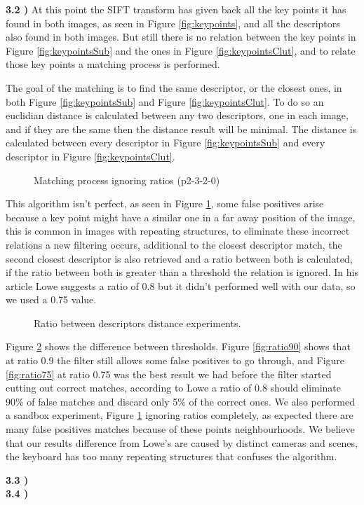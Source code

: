 \documentclass[12pt,a4paper]{article}
\begin{document}
\textbf{3.2 )} At this point the SIFT transform has given back all the key points it has found in both images, as seen in Figure \ref{fig:keypoints}, and all the descriptors also found in both images. But still there is no relation between the key points in Figure \ref{fig:keypointsSub} and the ones in Figure \ref{fig:keypointsClut}, and to relate those key points a matching process is performed.
\par
	The goal of the matching is to find the same descriptor, or the closest ones, in both Figure \ref{fig:keypointsSub} and Figure \ref{fig:keypointsClut}. To do so an euclidian distance is calculated between any two descriptors, one in each image, and if they are the same then the distance result will be minimal. The distance is calculated between every descriptor in Figure \ref{fig:keypointsSub} and every descriptor in Figure \ref{fig:keypointsClut}.

\begin{figure}[!h]
	\centering
		{
			\setlength{\fboxsep}{1pt}
			\setlength{\fboxrule}{1pt}
		}
	\caption{Matching process ignoring ratios (p2-3-2-0)}
	\label{fig:noRatio}
\end{figure}
	
	This algorithm isn't perfect, as seen in Figure \ref{fig:noRatio}, some false positives arise because a key point might have a similar one in a far away position of the image, this is common in images with repeating structures, to eliminate these incorrect relations a new filtering occurs, additional to the closest descriptor match, the second closest descriptor is also retrieved and a ratio between both is calculated, if the ratio between both is greater than a threshold the relation is ignored. In his article Lowe suggests a ratio of 0.8 but it didn't performed well with our data, so we used a 0.75 value.

\begin{figure}[!h]
	\centering
	\quad
	\caption{Ratio between descriptors distance experiments.}
	\label{fig:matchRatio}
\end{figure}

	Figure \ref{fig:matchRatio} shows the difference between thresholds. Figure \ref{fig:ratio90} shows that at ratio 0.9 the filter still allows some false positives to go through, and Figure \ref{fig:ratio75} at ratio 0.75 was the best result we had before the filter started cutting out correct matches, according to Lowe a ratio of 0.8 should eliminate 90\% of false matches and discard only 5\% of the correct ones. We also performed a sandbox experiment, Figure \ref{fig:noRatio} ignoring ratios completely, as expected there are many false positives matches because of these points neighbourhoods. We believe that our results difference from Lowe's are caused by distinct cameras and scenes, the keyboard has too many repeating structures that confuses the algorithm.

\textbf{3.3 )}
\\
\textbf{3.4 )}
\\
\end{document}
